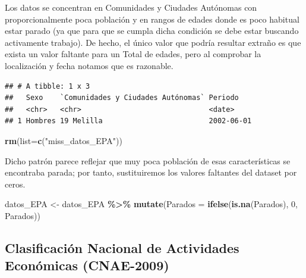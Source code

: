 \documentclass[notspecified,article,submit,moreauthors,pdftex]{Definitions/mdpi}
\newenvironment{Shaded}{\begin{snugshade}}{\end{snugshade}}
\newcommand{\AttributeTok}[1]{\textcolor[rgb]{0.13,0.29,0.53}{#1}}
\newcommand{\DecValTok}[1]{\textcolor[rgb]{0.00,0.00,0.81}{#1}}
\newcommand{\FunctionTok}[1]{\textcolor[rgb]{0.13,0.29,0.53}{\textbf{#1}}}
\newcommand{\NormalTok}[1]{#1}
\newcommand{\OtherTok}[1]{\textcolor[rgb]{0.56,0.35,0.01}{#1}}
\newcommand{\SpecialCharTok}[1]{\textcolor[rgb]{0.81,0.36,0.00}{\textbf{#1}}}
\newcommand{\StringTok}[1]{\textcolor[rgb]{0.31,0.60,0.02}{#1}}
\begin{document}
Los datos se concentran en Comunidades y Ciudades Autónomas con
proporcionalmente poca población y en rangos de edades donde es poco
habitual estar parado (ya que para que se cumpla dicha condición se debe
estar buscando activamente trabajo). De hecho, el único valor que podría
resultar extraño es que exista un valor faltante para un Total de
edades, pero al comprobar la localización y fecha notamos que es
razonable.

\begin{Shaded}
\end{Shaded}

\begin{verbatim}
## # A tibble: 1 x 3
##   Sexo    `Comunidades y Ciudades Autónomas` Periodo   
##   <chr>   <chr>                              <date>    
## 1 Hombres 19 Melilla                         2002-06-01
\end{verbatim}

\begin{Shaded}
\begin{Highlighting}[]
\FunctionTok{rm}\NormalTok{(}\AttributeTok{list=}\FunctionTok{c}\NormalTok{(}\StringTok{"miss\_datos\_EPA"}\NormalTok{))}
\end{Highlighting}
\end{Shaded}

Dicho patrón parece reflejar que muy poca población de esas
características se encontraba parada; por tanto, sustituiremos los
valores faltantes del dataset por ceros.

\begin{Shaded}
\begin{Highlighting}[]
\NormalTok{datos\_EPA }\OtherTok{\textless{}{-}}\NormalTok{ datos\_EPA }\SpecialCharTok{\%\textgreater{}\%} \FunctionTok{mutate}\NormalTok{(}\AttributeTok{Parados =} \FunctionTok{ifelse}\NormalTok{(}\FunctionTok{is.na}\NormalTok{(Parados), }\DecValTok{0}\NormalTok{, Parados))}
\end{Highlighting}
\end{Shaded}

\subsection{Clasificación Nacional de Actividades Económicas
(CNAE-2009)}\label{clasificaciuxf3n-nacional-de-actividades-econuxf3micas-cnae-2009}
\end{document}

